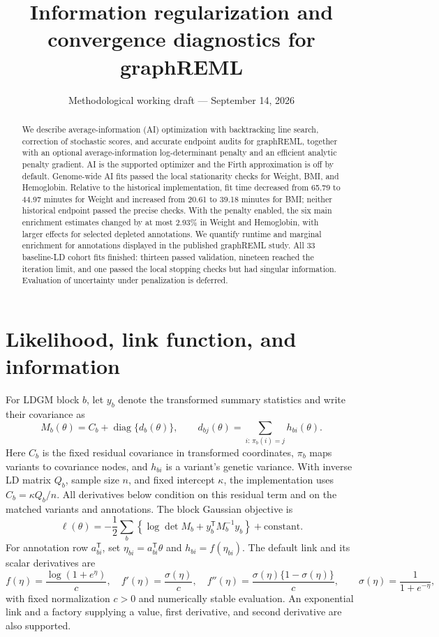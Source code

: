 \documentclass[11pt]{article}
\title{Information regularization and convergence diagnostics for graphREML}
\author{}
\date{Methodological working draft --- September 14, 2026}
\newcommand{\diag}{\operatorname{diag}}
\begin{document}
\maketitle
\begin{abstract}
We describe average-information (AI) optimization with backtracking line search, correction of stochastic scores, and accurate endpoint audits for graphREML, together with an optional average-information log-determinant penalty and an efficient analytic penalty gradient. AI is the supported optimizer and the Firth approximation is off by default. Genome-wide AI fits passed the local stationarity checks for Weight, BMI, and Hemoglobin. Relative to the historical implementation, fit time decreased from 65.79 to 44.97 minutes for Weight and increased from 20.61 to 39.18 minutes for BMI; neither historical endpoint passed the precise checks. With the penalty enabled, the six main enrichment estimates changed by at most 2.93\% in Weight and Hemoglobin, with larger effects for selected depleted annotations. We quantify runtime and marginal enrichment for annotations displayed in the published graphREML study. All 33 baseline-LD cohort fits finished: thirteen passed validation, nineteen reached the iteration limit, and one passed the local stopping checks but had singular information. Evaluation of uncertainty under penalization is deferred.
\end{abstract}

\section{Likelihood, link function, and information}
For LDGM block $b$, let $y_b$ denote the transformed summary statistics and write their covariance as
\begin{equation}
 M_b(\theta)=C_b+\diag\{d_b(\theta)\},\qquad
 d_{bj}(\theta)=\sum_{i:\,\pi_b(i)=j}h_{bi}(\theta).
 \label{eq:cov}
\end{equation}
Here $C_b$ is the fixed residual covariance in transformed coordinates, $\pi_b$ maps variants to covariance nodes, and $h_{bi}$ is a variant's genetic variance. With inverse LD matrix $Q_b$, sample size $n$, and fixed intercept $\kappa$, the implementation uses $C_b=\kappa Q_b/n$. All derivatives below condition on this residual term and on the matched variants and annotations. The block Gaussian objective is
\begin{equation}
 \ell(\theta)=-\frac12\sum_b\left\{\log\det M_b+y_b^\mathsf{T}M_b^{-1}y_b\right\}+\mathrm{constant}.
\end{equation}
For annotation row $a_{bi}^\mathsf{T}$, set $\eta_{bi}=a_{bi}^\mathsf{T}\theta$ and $h_{bi}=f(\eta_{bi})$. The default link and its scalar derivatives are
\begin{equation}
 f(\eta)=\frac{\log(1+e^\eta)}{c},\quad
 f'(\eta)=\frac{\sigma(\eta)}{c},\quad
 f''(\eta)=\frac{\sigma(\eta)\{1-\sigma(\eta)\}}{c},
 \qquad \sigma(\eta)=\frac1{1+e^{-\eta}},
\end{equation}
with fixed normalization $c>0$ and numerically stable evaluation. An exponential link and a factory supplying a value, first derivative, and second derivative are also supported.
\end{document}
